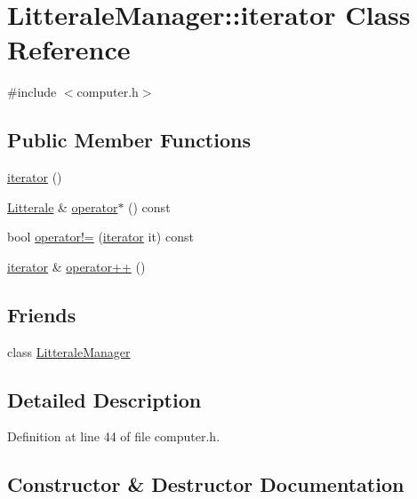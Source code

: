 \hypertarget{class_litterale_manager_1_1iterator}{}\section{Litterale\+Manager\+:\+:iterator Class Reference}
\label{class_litterale_manager_1_1iterator}


{\ttfamily \#include $<$computer.\+h$>$}

\subsection*{Public Member Functions}
\begin{DoxyCompactItemize}
\item 
\hyperlink{class_litterale_manager_1_1iterator_ac9a388cca532cb873bcf1ec5ef768dcc}{iterator} ()
\item 
\hyperlink{class_litterale}{Litterale} \& \hyperlink{class_litterale_manager_1_1iterator_ac92c56aa84ef69cfe9aafbe42b721b6a}{operator$\ast$} () const 
\item 
bool \hyperlink{class_litterale_manager_1_1iterator_ad319aadb70ba8482de219f7ef826242c}{operator!=} (\hyperlink{class_litterale_manager_1_1iterator}{iterator} it) const 
\item 
\hyperlink{class_litterale_manager_1_1iterator}{iterator} \& \hyperlink{class_litterale_manager_1_1iterator_a9fdfe99fd9c3eb4e57445fe8c1a1cf2b}{operator++} ()
\end{DoxyCompactItemize}
\subsection*{Friends}
\begin{DoxyCompactItemize}
\item 
class \hyperlink{class_litterale_manager_1_1iterator_a0aab3199db1ebeb99e33e66b9cf8e975}{Litterale\+Manager}
\end{DoxyCompactItemize}


\subsection{Detailed Description}


Definition at line 44 of file computer.\+h.



\subsection{Constructor \& Destructor Documentation}
